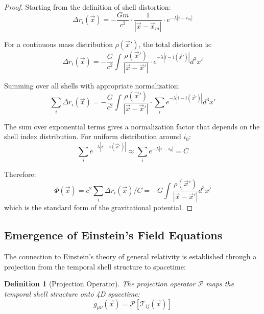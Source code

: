 \documentclass[12pt,a4paper]{article}
\newtheorem{definition}{Definition}[section]
\begin{document}
\begin{proof}
Starting from the definition of shell distortion:
\begin{equation}
\Delta r_i(\vec{x}) = -\frac{G m}{c^2} \cdot \frac{1}{|\vec{x} - \vec{x}_m|} \cdot e^{-\lambda |i - i_m|}
\end{equation}

For a continuous mass distribution $\rho(\vec{x}')$, the total distortion is:
\begin{equation}
\Delta r_i(\vec{x}) = -\frac{G}{c^2} \int \frac{\rho(\vec{x}')}{|\vec{x} - \vec{x}'|} \cdot e^{-\lambda |i - i(\vec{x}')|} d^3x'
\end{equation}

Summing over all shells with appropriate normalization:
\begin{equation}
\sum_i \Delta r_i(\vec{x}) = -\frac{G}{c^2} \int \frac{\rho(\vec{x}')}{|\vec{x} - \vec{x}'|} \cdot \sum_i e^{-\lambda |i - i(\vec{x}')|} d^3x'
\end{equation}

The sum over exponential terms gives a normalization factor that depends on the shell index distribution. For uniform distribution around $i_0$:
\begin{equation}
\sum_i e^{-\lambda |i - i(\vec{x}')|} \approx \sum_i e^{-\lambda |i - i_0|} = C
\end{equation}

Therefore:
\begin{equation}
\Phi(\vec{x}) = c^2 \sum_i \Delta r_i(\vec{x}) / C = -G \int \frac{\rho(\vec{x}')}{|\vec{x} - \vec{x}'|} d^3x'
\end{equation}
which is the standard form of the gravitational potential.
\end{proof}

\subsection{Emergence of Einstein's Field Equations}
\label{subsec:emergence-einstein}

The connection to Einstein's theory of general relativity is established through a projection from the temporal shell structure to spacetime:

\begin{definition}[Projection Operator]
\label{def:projection-operator}
The projection operator $\mathcal{P}$ maps the temporal shell structure onto 4D spacetime:
\begin{equation}
g_{\mu\nu}(\vec{x}) = \mathcal{P}[\mathcal{T}_{ij}(\vec{x})]
\end{equation}
\end{definition}
\end{document}
